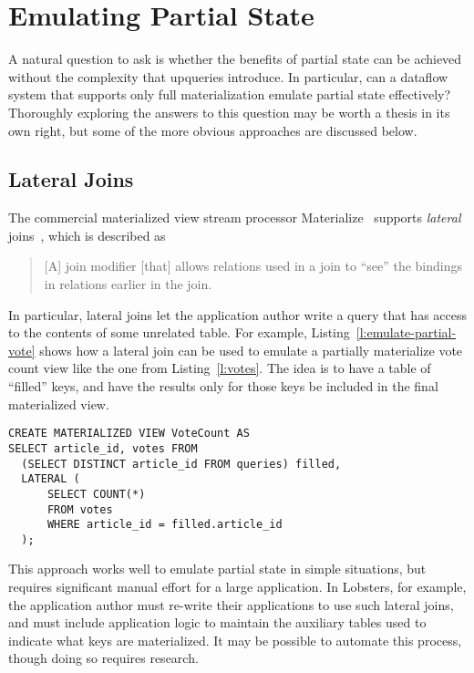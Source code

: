 \section{Emulating Partial State}
\label{s:disc:emulating}

A natural question to ask is whether the benefits of partial state can be
achieved without the complexity that upqueries introduce. In particular, can a
dataflow system that supports only full materialization emulate partial state
effectively? Thoroughly exploring the answers to this question may be worth a
thesis in its own right, but some of the more obvious approaches are discussed
below.

\subsection{Lateral Joins}

The commercial materialized view stream processor Materialize~\cite{materialize}
supports \emph{lateral} joins~\cite{lateral-join}, which is described as

\begin{quote}
  [A] join modifier [that] allows relations used in a join to ``see'' the
  bindings in relations earlier in the join.
\end{quote}

In particular, lateral joins let the application author write a query that has
access to the contents of some unrelated table. For example,
Listing~\vref{l:emulate-partial-vote} shows how a lateral join can be used to
emulate a partially materialize vote count view like the one from
Listing~\vref{l:votes}. The idea is to have a table of ``filled'' keys, and have
the results only for those keys be included in the final materialized view.

\begin{listing}[h]
  \begin{verbatim}
CREATE MATERIALIZED VIEW VoteCount AS
SELECT article_id, votes FROM
  (SELECT DISTINCT article_id FROM queries) filled,
  LATERAL (
      SELECT COUNT(*)
      FROM votes
      WHERE article_id = filled.article_id
  );
  \end{verbatim}
  \caption{Using a Materialize lateral join to emulate partial state in vote.}
  \label{l:emulate-partial-vote}
\end{listing}

This approach works well to emulate partial state in simple situations, but
requires significant manual effort for a large application. In Lobsters, for
example, the application author must re-write their applications to use such
lateral joins, and must include application logic to maintain the auxiliary
tables used to indicate what keys are materialized. It may be possible to
automate this process, though doing so requires research.

